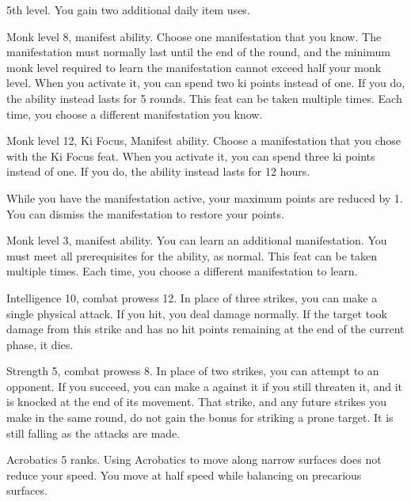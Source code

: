 \featpre 5th level.
\featben You gain two additional daily item uses.

\featpres Monk level 8, manifest \ki ability.
\featben Choose one \ki manifestation that you know.
The manifestation must normally last until the end of the round, and the minimum monk level required to learn the manifestation cannot exceed half your monk level.
When you activate it, you can spend two ki points instead of one.
If you do, the ability instead lasts for 5 rounds.
 This feat can be taken multiple times.
Each time, you choose a different \ki manifestation you know.

\featpres Monk level 12, Ki Focus, Manifest \ki ability.
\featben Choose a \ki manifestation that you chose with the Ki Focus feat.
When you activate it, you can spend three ki points instead of one.
If you do, the ability instead lasts for 12 hours.

While you have the manifestation active, your maximum \ki points are reduced by 1.
You can dismiss the manifestation to restore your \ki points.

\featpres Monk level 3, manifest \ki ability.
\featben You can learn an additional \ki manifestation.
You must meet all prerequisites for the ability, as normal.
 This feat can be taken multiple times.
Each time, you choose a different \ki manifestation to learn.

\featpres Intelligence 10, combat prowess 12.
\featben In place of three strikes, you can make a single physical attack.
If you hit, you deal damage normally.
If the target took damage from this strike and has no hit points remaining at the end of the current phase, it dies.

\featpres Strength 5, combat prowess 8.
\featben In place of two strikes, you can attempt to  an opponent.
If you succeed, you can make a  against it if you still threaten it, and it is knocked \prone at the end of its movement.
That strike, and any future strikes you make in the same round, do not gain the bonus for striking a prone target.
It is still falling as the attacks are made.

\featpre Acrobatics 5 ranks.
\featben Using Acrobatics to move along narrow surfaces does not reduce your speed.
 You move at half speed while balancing on precarious surfaces.

